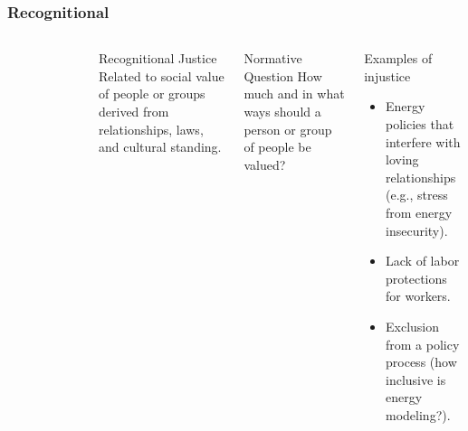 \begin{frame}
    \frametitle{Recognitional}
    \begin{columns}
        \column[t]{3cm}
        \begin{figure}
            \centering
        \end{figure}
        \column[t]{7cm}
        \begin{block}{Recognitional Justice}
            Related to social value of people or groups derived from relationships, laws, and cultural standing.
        \end{block}
        \begin{block}{Normative Question}
            How much and in what ways should a person or group of people be valued?
        \end{block}
        \begin{block}{Examples of injustice}
            \begin{itemize}
                \item Energy policies that interfere with loving relationships (e.g., stress from energy insecurity).\cite{van_uffelen_revisiting_2022}
                \item Lack of labor protections for workers.\cite{van_uffelen_revisiting_2022}
                \item Exclusion from a policy process (how inclusive is energy modeling?).\cite{van_uffelen_revisiting_2022}
            \end{itemize}
        \end{block}
    \end{columns}
    
\end{frame}

